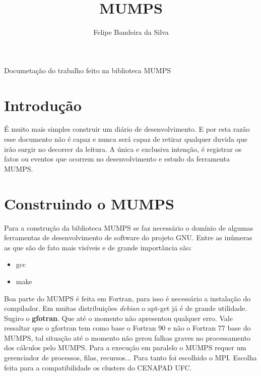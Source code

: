 \documentclass[paper=a4, fontsize=11pt]{article}
\title{MUMPS}
\author{Felipe Bandeira da Silva}
\begin{document}
\maketitle

\begin{center}
Documetação do trabalho feito na biblioteca MUMPS
\end{center}

\newpage
\listoffigures

\newpage
\tableofcontents


\newpage

\section{Introdução}

É muito mais simples construir um diário de desenvolvimento. E por esta razão
esse documento não é capaz e nunca será capaz de retirar qualquer duvida que
irão surgir no decorrer da leitura. A única e exclusiva intenção, é registrar
os fatos ou eventos que ocorrem no desenvolvimento e estudo da ferramenta
MUMPS.

\section{Construindo o MUMPS}

Para a construção da biblioteca MUMPS se faz necessário o domínio de algumas
ferramentas de desenvolvimento de software do projeto GNU. Entre as inúmeras
as que são de fato mais visíveis e de grande importância são:

\begin{itemize}
	\item gcc
	\item make
\end{itemize}

Boa parte do MUMPS é feita em Fortran, para isso é necessário a instalação 
do compilador. Em muitas distribuições \textit{debian} o apt-get já é de 
grande utilidade. Sugiro o \textbf{gfotran}. Que até o momento não apresentou
qualquer erro. Vale ressaltar que o gfortran tem como base o Fortran 90 e não
o Fortran 77 base do MUMPS, tal situação até o momento não gerou falhas graves
no processamento dos cálculos pelo MUMPS.
Para a execução em paralelo o MUMPS requer um gerenciador
de processos, filas, recursos... Para tanto foi escolhido o MPI. Escolha
feita para a compatibilidade os clusters do CENAPAD UFC. 
\end{document}
